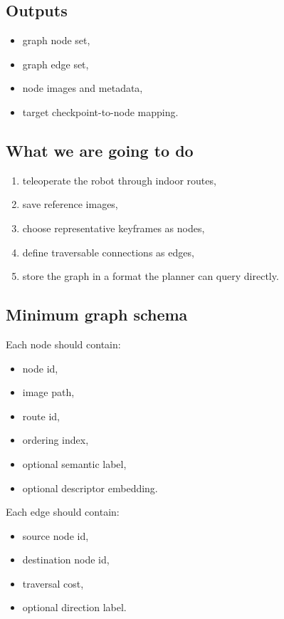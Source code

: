 \documentclass[11pt,a4paper]{article}
\begin{document}
\subsection{Outputs}

\begin{itemize}[nosep]
  \item graph node set,
  \item graph edge set,
  \item node images and metadata,
  \item target checkpoint-to-node mapping.
\end{itemize}

\subsection{What we are going to do}

\begin{enumerate}[nosep]
  \item teleoperate the robot through indoor routes,
  \item save reference images,
  \item choose representative keyframes as nodes,
  \item define traversable connections as edges,
  \item store the graph in a format the planner can query directly.
\end{enumerate}

\subsection{Minimum graph schema}

Each node should contain:
\begin{itemize}[nosep]
  \item node id,
  \item image path,
  \item route id,
  \item ordering index,
  \item optional semantic label,
  \item optional descriptor embedding.
\end{itemize}

Each edge should contain:
\begin{itemize}[nosep]
  \item source node id,
  \item destination node id,
  \item traversal cost,
  \item optional direction label.
\end{itemize}
\end{document}

